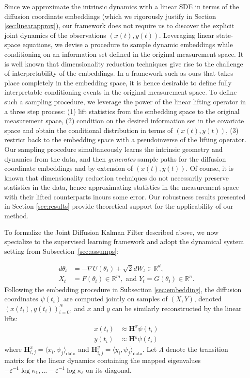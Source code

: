 \documentclass[11pt]{article}
\theoremstyle{plain}
\theoremstyle{definition}
\theoremstyle{remark}
\numberwithin{equation}{section}
\newcommand{\R}{\mathbb{R}}
\newcommand{\veps}{\varepsilon}
\begin{document}
Since we approximate the intrinsic dynamics with a linear SDE in terms of the diffusion coordinate embeddings (which we rigorously justify in Section \ref{sec:linearapprox}), our framework does not require us to discover the explicit joint dynamics of the observations $(x(t), y(t))$. Leveraging linear state-space equations, we devise a procedure to sample dynamic embeddings while conditioning on an information set defined in the original measurement space. 
It is well known that dimensionality reduction techniques give rise to the challenge of interpretability of the embeddings. In a framework such as ours that takes place completely in the embedding space, it is hence desirable to define fully interpretable conditioning events in the original measurement space. To define such a sampling procedure, we leverage the power of the linear lifting operator in a three step process: (1) lift statistics from the embedding space to the original measurement space, (2) condition on the desired information set in the  covariate space and obtain the conditional distribution in terms of $(x(t), y(t))$, (3) restrict back to the embedding space with a pseudoinverse of the lifting operator. Our sampling procedure simultaneously learns the intrinsic geometry and dynamics from the data, and then \textit{generates} sample paths for the diffusion coordinate embeddings and by extension of $(x(t), y(t))$. Of course, it is known that dimensionality reduction techniques do not necessarily preserve statistics in the data, hence approximating statistics in the measurement space with their lifted counterparts incurs some error.
Our robustness results presented in Section \ref{sec:results} provide theoretical support for the applicability of our method.






To formalize the Joint Diffusion Kalman Filter described above, we now specialize to the supervised learning framework and adopt the dynamical system setting from Subsection~\ref{sec:assumps}:

\begin{equation*}
\begin{aligned}
d \theta_t&= -\nabla U(\theta_t)+\sqrt{2}dW_t\in \R^d,\\
X_t&=F(\theta_t)\in \R^m,\text{ and }Y_t=G(\theta_t)\in \R^n.
\end{aligned}
\end{equation*}
Following the embedding procedure in Subsection \ref{sec:embedding}, the diffusion coordinates $\psi(t_i)$ are computed jointly on samples of $(X,Y)$, denoted $(x(t_i),y(t_i))_{i=0}^N$, and $x$ and $y$ can be similarly reconstructed by the linear lifts:
\begin{align*}
x(t_i)&\approx \mathbf{H}^x \psi(t_i)\\
y(t_i)&\approx \mathbf{H}^y \psi(t_i)
\end{align*}
where $\mathbf{H}_{i,j}^x=\langle x_i, \psi_j \rangle_{\text{data}}$ and $\mathbf{H}_{i,j}^y=\langle y_i, \psi_j \rangle_{\text{data}}$. Let $\Lambda$ denote the transition matrix for the linear dynamics containing the mapped eigenvalues ${-\veps^{-1}\log \kappa_1,\dots -\veps^{-1}\log \kappa_\ell}$ on its diagonal.
\end{document}
